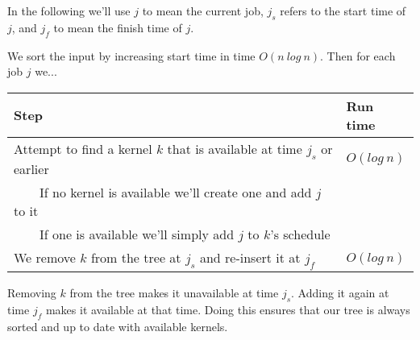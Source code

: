 \documentclass{tufte-handout}
\newcommand{\tabitem}{~~\llap{\textbullet}~~}
\begin{document}
  In the following we'll use $j$ to mean the current job, $j_s$ refers to the start time of $j$, and $j_f$ to mean the finish time of $j$.\linebreak

  We sort the input by increasing start time in time $O(n\ log\ n)$. Then for each job $j$ we...
  
  \begin{tabular}{| l | l |} \hline
    \textbf{Step} & \textbf{Run time} \\ \hline
    Attempt to find a kernel $k$ that is available at time $j_s$ or earlier & $O(log\ n)$ \\
    \tabitem If no kernel is available we'll create one and add $j$ to it &  \\
    \tabitem If one is available we'll simply add $j$ to $k$'s schedule &  \\
    We remove $k$ from the tree at $j_s$ and re-insert it at $j_f$ & $O(log\ n)$ \\
    \hline
  \end{tabular}
  
  Removing $k$ from the tree makes it unavailable at time $j_s$. Adding it again at time $j_f$ makes it available at that time. Doing this ensures that our tree is always sorted and up to date with available kernels.
  
\end{document}
